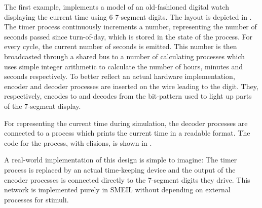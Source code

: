   The first example, implements a model of an old-fashioned digital watch
  displaying the current time using 6 7-segment digits. The layout is depicted
  in . The timer process continuously increments a number,
  representing the number of seconds passed since turn-of-day, which is stored
  in the state of the process. For every cycle, the current number of seconds is
  emitted. This number is then broadcasted through a shared bus to a number of
  calculating processes which uses simple integer arithmetic to calculate the
  number of hours, minutes and seconds respectively. To better reflect an actual
  hardware implementation, encoder and decoder processes are inserted on the
  wire leading to the digit. They, respectively, encodes to and decodes from the
  bit-pattern used to light up parts of the 7-segment display.

  For representing the current time during simulation, the decoder processes are
  connected to a process which prints the current time in a readable format. The
  code for the process, with elisions, is shown in .

  A real-world implementation of this design is simple to imagine: The timer
  process is replaced by an actual time-keeping device and the output of the
  encoder processes is connected directly to the 7-segment digits they
  drive. This network is implemented purely in SMEIL without depending on
  external processes for stimuli.

